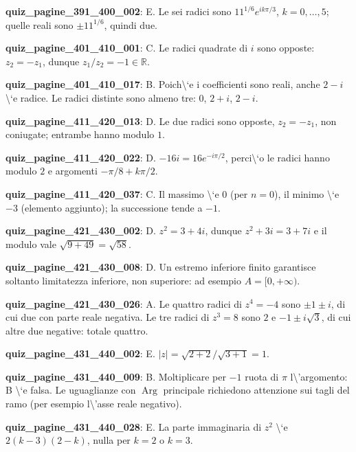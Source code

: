 \documentclass[11pt,a4paper]{article}
\newcounter{quiz}
\begin{document}
\noindent\textbf{quiz\_pagine\_391\_400\_002}: E. Le sei radici sono $11^{1/6}e^{ik\pi/3}$, $k=0,\ldots,5$; quelle reali sono $\pm11^{1/6}$, quindi due.\par\medskip
\noindent\textbf{quiz\_pagine\_401\_410\_001}: C. Le radici quadrate di $i$ sono opposte: $z_2=-z_1$, dunque $z_1/z_2=-1\in\mathbb R$.\par\medskip
\noindent\textbf{quiz\_pagine\_401\_410\_017}: B. Poich\textbackslash{}`e i coefficienti sono reali, anche $2-i$ \textbackslash{}`e radice. Le radici distinte sono almeno tre: $0$, $2+i$, $2-i$.\par\medskip
\noindent\textbf{quiz\_pagine\_411\_420\_013}: D. Le due radici sono opposte, $z_2=-z_1$, non coniugate; entrambe hanno modulo $1$.\par\medskip
\noindent\textbf{quiz\_pagine\_411\_420\_022}: D. $-16i=16e^{-i\pi/2}$, perci\textbackslash{}`o le radici hanno modulo $2$ e argomenti $-\pi/8+k\pi/2$.\par\medskip
\noindent\textbf{quiz\_pagine\_411\_420\_037}: C. Il massimo \textbackslash{}`e $0$ (per $n=0$), il minimo \textbackslash{}`e $-3$ (elemento aggiunto); la successione tende a $-1$.\par\medskip
\noindent\textbf{quiz\_pagine\_421\_430\_002}: D. $z^2=3+4i$, dunque $z^2+3i=3+7i$ e il modulo vale $\sqrt{9+49}=\sqrt{58}$.\par\medskip
\noindent\textbf{quiz\_pagine\_421\_430\_008}: D. Un estremo inferiore finito garantisce soltanto limitatezza inferiore, non superiore: ad esempio $A=[0,+\infty)$.\par\medskip
\noindent\textbf{quiz\_pagine\_421\_430\_026}: A. Le quattro radici di $z^4=-4$ sono $\pm1\pm i$, di cui due con parte reale negativa. Le tre radici di $z^3=8$ sono $2$ e $-1\pm i\sqrt3$, di cui altre due negative: totale quattro.\par\medskip
\noindent\textbf{quiz\_pagine\_431\_440\_002}: E. $|z|=\sqrt{2+2}/\sqrt{3+1}=1$.\par\medskip
\noindent\textbf{quiz\_pagine\_431\_440\_009}: B. Moltiplicare per $-1$ ruota di $\pi$ l\textbackslash{}'argomento: B \textbackslash{}`e falsa. Le uguaglianze con $\operatorname{Arg}$ principale richiedono attenzione sui tagli del ramo (per esempio l\textbackslash{}'asse reale negativo).\par\medskip
\noindent\textbf{quiz\_pagine\_431\_440\_028}: E. La parte immaginaria di $z^2$ \textbackslash{}`e $2(k-3)(2-k)$, nulla per $k=2$ o $k=3$.\par\medskip
\end{document}
